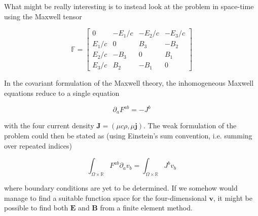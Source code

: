 \documentclass[11pt, a4paper]{article}
\begin{document}
What might be really interesting is to instead look at the problem in space-time 
using the Maxwell tensor

\begin{equation}
    \mathbb{F} = \begin{bmatrix}
        0 & -E_1/c & -E_2/c & -E_3/c \\
        E_1/c & 0 & B_3 & -B_2 \\ 
        E_2/c & -B_3 & 0 & B_1 \\ 
        E_3/c & B_2 & -B_1 & 0
    \end{bmatrix}
\end{equation}

In the covariant formulation of the Maxwell theory, the inhomogeneous Maxwell
equations reduce to a single equation

\begin{equation}
    \partial_a F^{ab} = - J^b
\end{equation}

with the four current density $\mathbf{J} = (\mu c \rho, \mu \mathbf{j})$. The 
weak formulation of the problem could then be stated as (using Einstein's sum
convention, i.e. summing over repeated indices)

\begin{equation}
    \int_{\Omega \times \mathbb{R}} F^{ab} \partial_a v_b = \int_{\Omega \times \mathbb{R}} J^b v_b
\end{equation}

where boundary conditions are yet to be determined. If we somehow would manage
to find a suitable function space for the four-dimensional $\mathbf{v}$, it might 
be possible to find both $\mathbf{E}$ and $\mathbf{B}$ from a finite element method.


\end{document}
